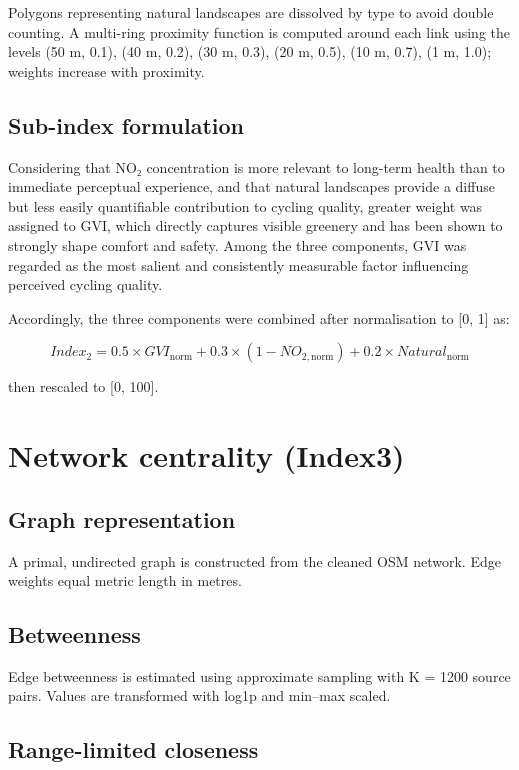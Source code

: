 \documentclass[
  12pt,
  oneside]{book}
\begin{document}
Polygons representing natural landscapes are dissolved by type to avoid double counting. A multi-ring proximity function is computed around each link using the levels (50 m, 0.1), (40 m, 0.2), (30 m, 0.3), (20 m, 0.5), (10 m, 0.7), (1 m, 1.0); weights increase with proximity.

\subsection{Sub-index formulation}\label{sub-index-formulation}

Considering that NO₂ concentration is more relevant to long-term health than to immediate perceptual experience, and that natural landscapes provide a diffuse but less easily quantifiable contribution to cycling quality, greater weight was assigned to GVI, which directly captures visible greenery and has been shown to strongly shape comfort and safety. Among the three components, GVI was regarded as the most salient and consistently measurable factor influencing perceived cycling quality.

Accordingly, the three components were combined after normalisation to {[}0, 1{]} as:

\[Index_{2} = 0.5 \times GVI_{\text{norm}} + 0.3 \times (1 - NO_{2,\text{norm}}) + 0.2 \times Natural_{\text{norm}}\]

then rescaled to {[}0, 100{]}.

\section{Network centrality (Index3)}\label{network-centrality-index3}

\subsection{Graph representation}\label{graph-representation}

A primal, undirected graph is constructed from the cleaned OSM network. Edge weights equal metric length in metres.

\subsection{Betweenness}\label{betweenness}

Edge betweenness is estimated using approximate sampling with K = 1200 source pairs. Values are transformed with log1p and min--max scaled.

\subsection{Range-limited closeness}\label{range-limited-closeness}
\end{document}
